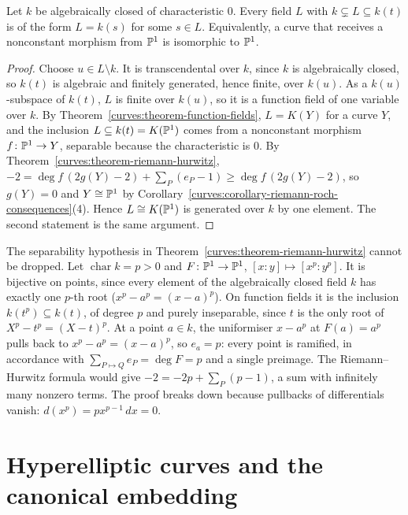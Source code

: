 \begin{corollary}[L\"uroth]\label{curves:corollary-luroth}
Let $k$ be algebraically closed of characteristic $0$. Every field $L$ with $k \subsetneq L \subseteq k(t)$ is of the form $L = k(s)$ for some $s \in L$. Equivalently, a curve that receives a nonconstant morphism from
$\mathbb{P}^1$ is isomorphic to $\mathbb{P}^1$.
\end{corollary}

\begin{proof}
Choose $u \in L \setminus k$. It is transcendental over $k$, since $k$ is algebraically closed, so $k(t)$ is algebraic and finitely generated, hence finite, over $k(u)$. As a $k(u)$-subspace of $k(t)$, $L$ is finite over
$k(u)$, so it is a function field of one variable over $k$. By Theorem~\ref{curves:theorem-function-fields}, $L = K(Y)$ for a curve $Y$, and the inclusion $L \subseteq k(t) = K(\mathbb{P}^1)$ comes from a nonconstant
morphism $f \colon \mathbb{P}^1 \to Y$, separable because the characteristic is $0$. By Theorem~\ref{curves:theorem-riemann-hurwitz}, $-2 = \deg f\,(2g(Y) - 2) + \sum_P(e_P - 1) \geq \deg f\,(2g(Y) - 2)$, so $g(Y) = 0$
and $Y \cong \mathbb{P}^1$ by Corollary~\ref{curves:corollary-riemann-roch-consequences}(4). Hence $L \cong K(\mathbb{P}^1)$ is generated over $k$ by one element. The second statement is the same argument.
\end{proof}

\begin{counterexample}\label{curves:counterexample-frobenius}
The separability hypothesis in Theorem~\ref{curves:theorem-riemann-hurwitz} cannot be dropped. Let $\operatorname{char}k = p > 0$ and $F \colon \mathbb{P}^1 \to \mathbb{P}^1$, $[x : y] \mapsto [x^p : y^p]$. It is bijective on points,
since every element of the algebraically closed field $k$ has exactly one $p$-th root ($x^p - a^p = (x - a)^p$). On function fields it is the inclusion $k(t^p) \subseteq k(t)$, of degree $p$ and purely inseparable, since
$t$ is the only root of $X^p - t^p = (X - t)^p$. At a point $a \in k$, the uniformiser $x - a^p$ at $F(a) = a^p$ pulls back to $x^p - a^p = (x - a)^p$, so $e_a = p$: every point is ramified, in accordance with
$\sum_{P \mapsto Q}e_P = \deg F = p$ and a single preimage. The Riemann--Hurwitz formula would give $-2 = -2p + \sum_P(p - 1)$, a sum with infinitely many nonzero terms. The proof breaks down because pullbacks of
differentials vanish: $d(x^p) = px^{p-1}\,dx = 0$.
\end{counterexample}

\section{Hyperelliptic curves and the canonical embedding}\label{curves:section-canonical}

